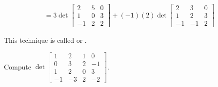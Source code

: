 \begin{applicationActivities}{2}{26}
\begin{observation}
\begin{align*}
&= 3 \det \begin{bmatrix}2 & 5 & 0 \\ 1 & 0 & 3 \\ -1 & 2 & 2 \end{bmatrix} +(-1)(2) \det \begin{bmatrix} 2 & 3 & 0 \\ 1 & 2 & 3 \\ -1 & -1 & 2 \end{bmatrix}
\end{align*}

This technique is called  or .
  \end{observation}

\begin{activity}{10}
  Compute  $\det \begin{bmatrix} 1 & 2 & 1 & 0 \\ 0 & 3 & 2 & -1 \\ 1 & 2 & 0 & 3 \\ -1 & -3 & 2 & -2 \end{bmatrix}$.

\end{activity}


\end{applicationActivities}
